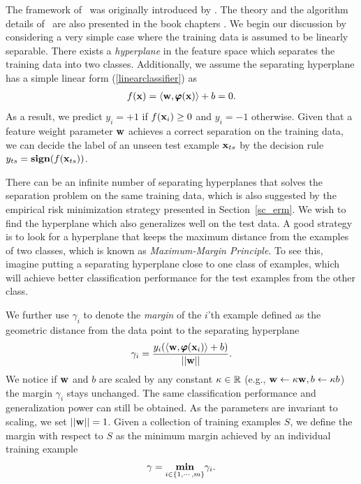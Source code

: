 {The framework of \svm\ was originally introduced by \citet{Cortes95support}.
The theory and the algorithm details of \svm\ are also presented in the book chapters \citep{Scholkopf02learning,Taylor04kernel,Bishop07}.
We begin our discussion by considering a very simple case where the training data is assumed to be linearly separable.
There exists a \textit{hyperplane} in the feature space which separates the training data into two classes.
Additionally, we assume the {separating hyperplane} has a simple linear form (\ref{linearclassifier}) as
\begin{align*}
	f(\mathbf {x})=\langle \mathbf {w}, \pmb \varphi(\mathbf {x}) \rangle + b = 0.
\end{align*}
As a result, we predict $y_i=+1$ if $f(\mathbf {x}_i)\ge0$ and $y_i=-1$ otherwise.
Given that a feature weight parameter $\mathbf {w}$ achieves a correct separation on the training data, we can decide the label of an unseen test example $\mathbf {x}_{ts}$ by the decision rule $y_{ts}=\textbf{sign}(f(\mathbf {x}_{ts}))$.

There can be an infinite number of separating hyperplanes that solves the separation problem on the same training data, which is also suggested by the empirical risk minimization strategy presented in Section~\ref{sc_erm}. 
We wish to find the hyperplane which also generalizes well on the test data.
A good strategy is to look for a hyperplane that keeps the maximum distance from the examples of two classes, which is known as \textit{Maximum-Margin Principle}.
To see this, imagine putting a separating hyperplane close to one class of examples, which will achieve better classification performance for the test examples from the other class.

We further use $\gamma_i$ to denote the \textit{margin} of the $i$'th example defined as the geometric distance from the data point to the separating hyperplane
\begin{align*}
	\gamma_i = \frac{y_i(\langle \mathbf {w}, \pmb \varphi(\mathbf {x}_i) \rangle+b)}{\left|\left| \mathbf {w} \right|\right|}.
\end{align*}
We notice if $\mathbf {w}$ and $b$ are scaled by any constant $\kappa\in\mathbb{R}$ (e.g., $\mathbf {w}\leftarrow\kappa\mathbf {w}, b\leftarrow\kappa b$) the margin $\gamma_i$ stays unchanged. 
The same classification performance and generalization power can still be obtained.
As the parameters are invariant to scaling, we set $\left|\left| \mathbf {w} \right|\right|=1$.
Given a collection of training examples $S$, we define the margin with respect to $S$ as the minimum margin achieved by an individual training example
\begin{align*}
	\gamma = \underset{i\in\{1,\cdots,m\}}{\textbf{min}}\gamma_i.
\end{align*}

}
